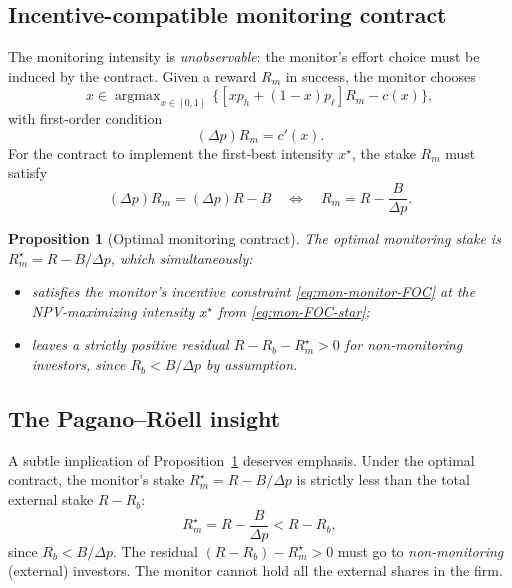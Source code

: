 \documentclass[11pt,a4paper,oneside]{book}
\DeclareMathOperator*{\argmax}{argmax}
\theoremstyle{plain}
\newtheorem{proposition}[theorem]{Proposition}
\theoremstyle{definition}
\theoremstyle{remark}
\numberwithin{equation}{chapter}
\begin{document}
\subsection{Incentive-compatible monitoring contract}

The monitoring intensity is \emph{unobservable}: the monitor's effort choice must be induced by the contract.
Given a reward $R_m$ in success, the monitor chooses
\begin{equation*}
  x \in \argmax_{x \in [0,1]} \, \bigl\{[x p_h + (1 - x) p_\ell] R_m - c(x)\bigr\},
\end{equation*}
with first-order condition
\begin{equation}\label{eq:mon-monitor-FOC}
  (\Delta p) R_m = c'(x).
\end{equation}
For the contract to implement the first-best intensity $x^\star$, the stake $R_m$ must satisfy
\begin{equation}\label{eq:mon-Rm-star}
  (\Delta p) R_m = (\Delta p) R - B
  \quad\Longleftrightarrow\quad
  R_m = R - \frac{B}{\Delta p}.
\end{equation}

\begin{proposition}[Optimal monitoring contract]\label{prop:mon-optimal}
The optimal monitoring stake is $R_m^\star = R - B/\Delta p$, which simultaneously:
\begin{itemize}
  \item satisfies the monitor's incentive constraint \eqref{eq:mon-monitor-FOC} at the NPV-maximizing intensity $x^\star$ from \eqref{eq:mon-FOC-star};
  \item leaves a strictly positive residual $R - R_b - R_m^\star > 0$ for non-monitoring investors, since $R_b < B/\Delta p$ by assumption.
\end{itemize}
\end{proposition}

\subsection{The Pagano--Röell insight}

A subtle implication of Proposition~\ref{prop:mon-optimal} deserves emphasis.
Under the optimal contract, the monitor's stake $R_m^\star = R - B/\Delta p$ is strictly less than the total external stake $R - R_b$:
\begin{equation*}
  R_m^\star = R - \frac{B}{\Delta p} < R - R_b,
\end{equation*}
since $R_b < B/\Delta p$.
The residual $(R - R_b) - R_m^\star > 0$ must go to \emph{non-monitoring} (external) investors.
The monitor cannot hold all the external shares in the firm.
\end{document}
